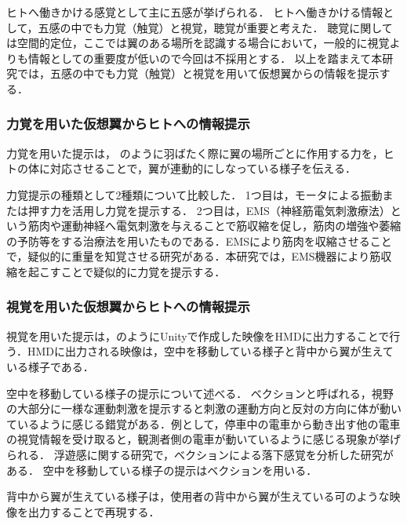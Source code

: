     ヒトへ働きかける感覚として主に五感が挙げられる．
    ヒトへ働きかける情報として，五感の中でも力覚（触覚）と視覚，聴覚が重要と考えた．
    聴覚に関しては空間的定位，ここでは翼のある場所を認識する場合において，一般的に視覚よりも情報としての重要度が低い\cite{岡嶋克典20182}ので今回は不採用とする．
    以上を踏まえて本研究では，五感の中でも力覚（触覚）と視覚を用いて仮想翼からの情報を提示する．

    \subsubsection{力覚を用いた仮想翼からヒトへの情報提示}

        力覚を用いた提示は，
        のように羽ばたく際に翼の場所ごとに作用する力を，ヒトの体に対応させることで，翼が連動的にしなっている様子を伝える．

        力覚提示の種類として2種類について比較した．
        1つ目は，モータによる振動または押す力を活用し力覚を提示する．
        2つ目は，EMS（神経筋電気刺激療法）という筋肉や運動神経へ電気刺激を与えることで筋収縮を促し，筋肉の増強や萎縮の予防等をする治療法を用いたものである．EMSにより筋肉を収縮させることで，疑似的に重量を知覚させる研究がある\cite{小川剛史2017電気的筋肉刺激が重量知覚に及ぼす影響の分析}．本研究では，EMS機器により筋収縮を起こすことで疑似的に力覚を提示する．
    
    \subsubsection{視覚を用いた仮想翼からヒトへの情報提示}
 
        視覚を用いた提示は，のようにUnityで作成した映像をHMDに出力することで行う．HMDに出力される映像は，空中を移動している様子と背中から翼が生えている様子である．

        空中を移動している様子の提示について述べる．
        ベクションと呼ばれる，視野の大部分に一様な運動刺激を提示すると刺激の運動方向と反対の方向に体が動いているように感じる錯覚がある\cite{妹尾武治2014ベクションとその周辺の近年の動向}．例として，停車中の電車から動き出す他の電車の視覚情報を受け取ると，観測者側の電車が動いているように感じる現象が挙げられる．
        浮遊感に関する研究で，ベクションによる落下感覚を分析した研究がある\cite{奥川夏輝2017VR空間における視覚刺激によって発生する落下感覚の分析}．
        空中を移動している様子の提示はベクションを用いる．

        背中から翼が生えている様子は，使用者の背中から翼が生えている可のような映像を出力することで再現する．  


